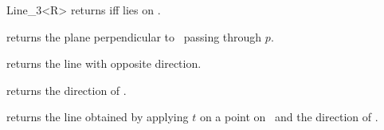 \begin{ccRefClass} {Line_3<R>}
       {returns  iff  lies on \ccVar.}


       {returns the plane perpendicular to \ccVar\ passing through $p$.}

       {returns the line with opposite direction.}

       {returns the direction of \ccVar.}

       {returns the line obtained by applying $t$ on a point on \ccVar\ 
        and the direction of \ccVar.}

\ccSeeAlso
{}

\end{ccRefClass} 
